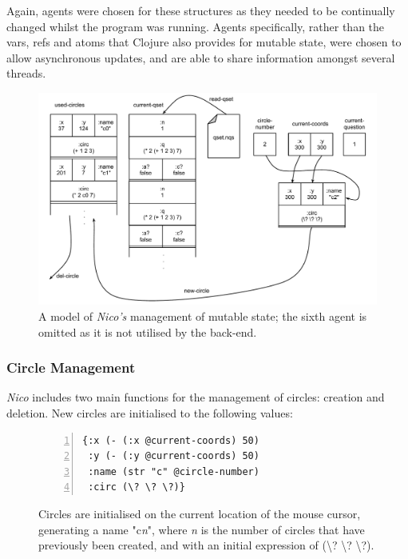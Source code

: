 \documentclass[12pt,twoside,notitlepage,xetex]{report}
\begin{document}
Again, agents were chosen for these structures as they needed to be continually
changed whilst the program was running.  Agents specifically, rather than the
vars, refs and atoms that Clojure also provides for mutable state, were chosen
to allow asynchronous updates, and are able to share information amongst
several threads. \cite{Halloway2009}

\begin{center}
\begin{figure}[H]
\begin{center}
\includegraphics[width=\textwidth-2cm]{figs/nico_backend.pdf}
\end{center}
\caption{A model of \emph{Nico's} management of mutable state; the sixth agent is omitted as it is not utilised by the back-end.}
\label{fig:Backend}
\end{figure}
\end{center}

\subsubsection{Circle Management}

\emph{Nico} includes two main functions for the management of circles: creation and deletion.  New circles are initialised to the following values:

\begin{center}
\begin{figure}[H]
\begin{center}
\begin{minipage}{2.5in}%
\begin{Verbatim}[fontsize=\small,numbers=left]
{:x (- (:x @current-coords) 50)
 :y (- (:y @current-coords) 50)
 :name (str "c" @circle-number)
 :circ (\? \? \?)}
\end{Verbatim}
\end{minipage}
\end{center}
\caption{Circles are initialised on the current location of the mouse cursor, generating a name {\ttfamily "c}\emph{n}{\ttfamily "}, where \emph{n} is the number of circles that have previously been created, and with an initial expression of {\ttfamily (\textbackslash? \textbackslash? \textbackslash?)}.}
\label{fig:InitCirc}
\end{figure}
\end{center}
\end{document}
